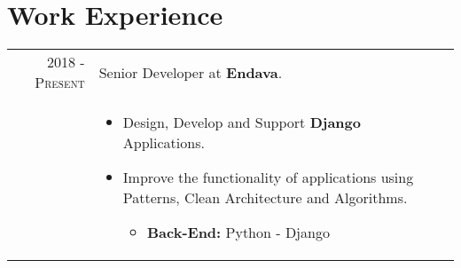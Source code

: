 \documentclass[a4paper,11pt]{article} %
\begin{document}
\section{Work Experience}
\begin{tabular}{r|p{12cm}}
\textsc{2018 - Present} & Senior Developer at \textbf{Endava}.\\
& \footnotesize{
\begin{itemize}
\item Design, Develop and Support \textbf{Django} Applications.
\item Improve the functionality of applications using Patterns, Clean Architecture and Algorithms.
\begin{itemize}
\item \textbf{Back-End:} Python - Django
\end{itemize}
\end{itemize}}\\


\end{tabular}
\end{document}
